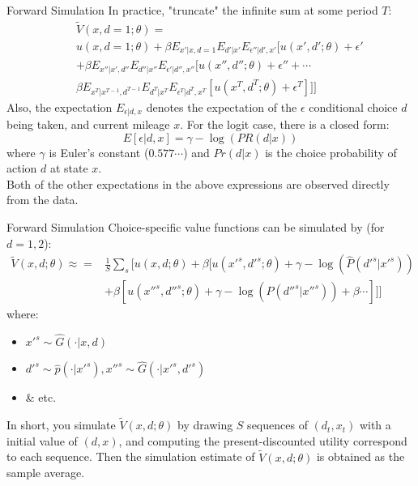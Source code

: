 \documentclass[xcolor=pdftex,dvipsnames,table,mathserif,aspectratio=169]{beamer}
\begin{document}
\begin{frame}{Forward Simulation}
In practice, "truncate" the infinite sum at some period $T$: 
\begin{eqnarray*} 
&& \tilde V(x, d=1;\theta) =\\
&& u(x, d=1; \theta) + \beta E_{x'|x, d=1} E_{d'|x'} E_{\epsilon''|d', x'} [u(x', d';\theta) + \epsilon' \\
&& + \beta E_{x''|x', d''} E_{d''|x''} E_{\epsilon'|d'', x''} [u(x'', d'';\theta) + \epsilon'' + \cdots \\
&& \beta E_{x^T|x^{T-1}, d^{T-1}} E_{d^T|x^T} E_{\epsilon^T|d^T, x^T} [u(x^T, d^T;\theta) + \epsilon^T ]]]
\end{eqnarray*}
Also, the expectation $E_{\epsilon|d, x}$ denotes the expectation of the $\epsilon$ conditional choice $d$ being taken, and current mileage $x$. For the logit case, there is a closed form:
$$ E[\epsilon | d, x] = \gamma - \log(PR(d|x))$$
where $\gamma$ is Euler's constant ($0.577\cdots$) and $Pr(d|x)$ is the choice probability of action $d$ at state $x$. \\
\vspace{2mm}
Both of the other expectations in the above expressions are observed directly from the data. 
\end{frame}

\begin{frame}{Forward Simulation}
Choice-specific value functions can be simulated by (for $d=1,2$): 
\begin{eqnarray*}
\tilde V (x, d; \theta) \approx = & \frac 1 S \sum_s [ u(x, d;\theta) + \beta [ u(x'^s, d'^s;\theta) + \gamma - \log(\hat P(d'^s|x'^s)) \\
& +\beta [ u(x''^s, d''^s;\theta) + \gamma - \log (\hat P (d''^s |x''^s)) + \beta \cdots ]]]
\end{eqnarray*}
where:
\begin{itemize}
\item $x'^s \sim \hat G(\cdot | x, d)$ 
\item $d'^s \sim \hat p(\cdot | x'^s), x''^s \sim \hat G(\cdot | x'^s, d'^s)$ 
\item \& etc. 
\end{itemize}
In short, you simulate $\tilde V (x, d;\theta)$ by drawing $S$ \alert{sequences} of $(d_t, x_t)$ with a initial value of $(d, x)$, and computing the present-discounted utility correspond to each sequence. Then the simulation estimate of $\tilde V (x, d;\theta)$ is obtained as the sample average. 
\end{frame}
\end{document}
